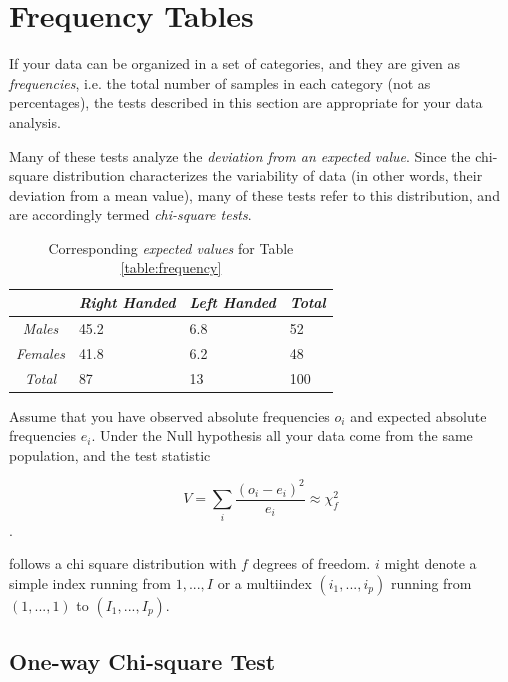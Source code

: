 \section{Frequency Tables} 

If your data can be organized in a set of categories, and they are given as \emph{frequencies}, i.e. the total number of samples in each category (not as percentages), the tests described in this section are appropriate for your data analysis.

Many of these tests analyze the \emph{deviation from an expected value}. Since the chi-square distribution characterizes the variability of data (in other words, their deviation from a mean value), many of these tests refer to this distribution, and are accordingly termed \emph{chi-square tests}.

\begin{table}
  \centering
  \begin{tabular}{|c|l l l|}
  \hline
  & \emph{Right Handed} & \emph{Left Handed} & \emph{Total} \\
  \hline
  \emph{Males} & 45.2 & 6.8 & 52 \\
  \emph{Females} & 41.8 & 6.2 & 48 \\
  \emph{Total} & 87 & 13 & 100 \\
  \hline
  \end{tabular}

  \caption{Corresponding \emph{expected values} for Table \ref{table:frequency}\label{table:expectedValues}}
\end{table}


Assume that you have observed absolute frequencies $o_i$ and expected absolute frequencies $e_i$. Under the Null hypothesis all your data come from the same population, and the test statistic

\begin{equation}\label{eq:chi2}
  V = \sum_i \frac{(o_i-e_i)^2}{e_i} \approx \chi^2_f
\end{equation}.

follows a chi square distribution with $f$ degrees of freedom. $i$ might denote a simple index running from $1,...,I$ or a multiindex $(i_1,...,i_p)$ running from $(1,...,1)$ to $(I_1,...,I_p)$.

\subsection{One-way Chi-square Test}

